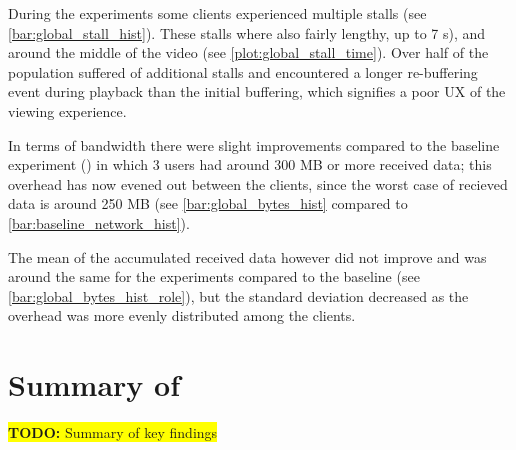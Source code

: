 During the experiments some clients experienced multiple stalls (see \autoref{bar:global_stall_hist}). These stalls where also fairly lengthy, up to 7 \acs{s}), and around the middle of the video (see \autoref{plot:global_stall_time}). Over half of the population suffered of additional stalls and encountered a longer re-buffering event during playback than the initial buffering, which signifies a poor \ac{UX} of the viewing experience.






In terms of bandwidth there were slight improvements compared to the baseline experiment () in which 3 users had around 300 \ac{MB} or more received data; this overhead has now evened out between the clients, since the worst case of recieved data is around 250 \ac{MB} (see \autoref{bar:global_bytes_hist} compared to \autoref{bar:baseline_network_hist}).

The mean of the accumulated received data however did not improve and was around the same for the experiments compared to the baseline (see \autoref{bar:global_bytes_hist_role}), but the standard deviation decreased as the overhead was more evenly distributed among the clients.






\section{Summary of }

\colorbox{yellow}{\textbf{TODO:} Summary of key findings}

